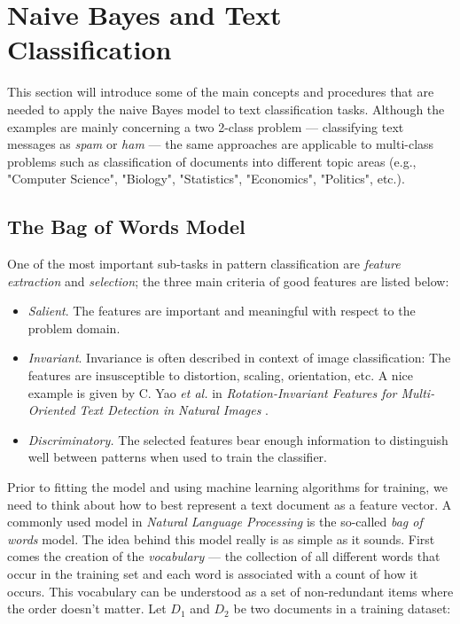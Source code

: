 \documentclass{article}
\begin{document}
 \section{Naive Bayes and Text Classification}

This section will introduce some of the main concepts and procedures that are needed to apply the naive Bayes model to text classification tasks. Although the examples are mainly concerning a two 2-class problem --- classifying text messages as \emph{spam} or \emph{ham} --- the same approaches are applicable to multi-class problems such as classification of documents into different topic areas (e.g., "Computer Science", "Biology", "Statistics", "Economics", "Politics", etc.).

\subsection{The Bag of Words Model}
\label{sec:the_bag_of_words_model}

One of the most important sub-tasks in pattern classification are \emph{feature extraction} and \emph{selection}; the three main criteria of good features are listed below:

\begin{itemize}
	\item \emph{Salient}. The features are important and meaningful with respect to the problem domain.
	\item \emph{Invariant}. Invariance is often described in context of image classification: The features are insusceptible to distortion, scaling, orientation, etc. A nice example is given by C. Yao \emph{et al.} in \emph{Rotation-Invariant Features for Multi-Oriented Text Detection in Natural Images} \cite{yao2013rotation}.
	\item \emph{Discriminatory.} The selected features bear enough information to distinguish well between patterns when used to train the classifier.
\end{itemize}

Prior to fitting the model and using machine learning algorithms for training, we need to think about how to best represent a text document as a feature vector. A commonly used model in \emph{Natural Language Processing} is the so-called \emph{bag of words} model. The idea behind this model really is as simple as it sounds. First comes the creation of the \emph{vocabulary} --- the collection of all different words that occur in the training set and each word is associated with a count of how it occurs. This vocabulary can be understood as a set of non-redundant items where the order doesn't matter. Let $D_1$ and $D_2$ be two documents in a training dataset:
\end{document}
